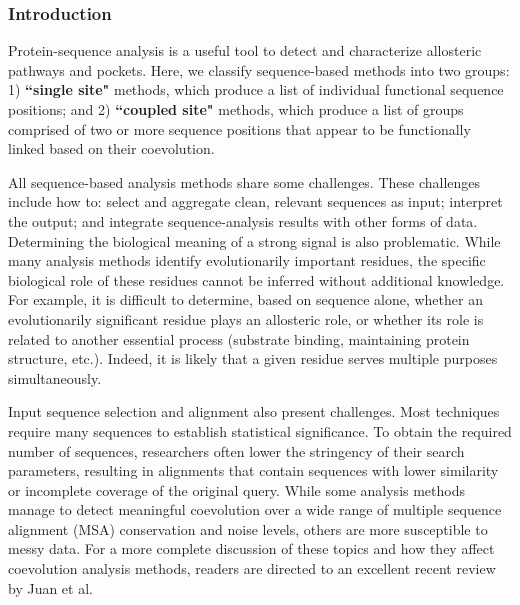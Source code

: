 \subsubsection{Introduction}
\par Protein-sequence analysis is a useful tool to detect and characterize allosteric pathways and pockets. Here, we classify sequence-based methods into two groups: 1) \textbf{``single site"} methods, which produce a list of individual functional sequence positions; and 2) \textbf{``coupled site"} methods, which produce a list of groups comprised of two or more sequence positions that appear to be functionally linked based on their coevolution.
\par All sequence-based analysis methods share some challenges. These challenges include how to: select and aggregate clean, relevant sequences as input; interpret the output; and integrate sequence-analysis results with other forms of data. Determining the biological meaning of a strong signal is also problematic. While many analysis methods identify evolutionarily important residues, the specific biological role of these residues cannot be inferred without additional knowledge. For example, it is difficult to determine, based on sequence alone, whether an evolutionarily significant residue plays an allosteric role, or whether its role is related to another essential process (\eg substrate binding, maintaining protein structure, etc.).\cite{Talavera2015,Fodor2004c} Indeed, it is likely that a given residue serves multiple purposes simultaneously.
\par Input sequence selection and alignment also present challenges. Most techniques require many sequences to establish statistical significance. To obtain the required number of sequences, researchers often lower the stringency of their search parameters, resulting in alignments that contain sequences with lower similarity or incomplete coverage of the original query. While some analysis methods manage to detect meaningful coevolution over a wide range of multiple sequence alignment (MSA) conservation and noise levels, others are more susceptible to messy data.\cite{Fodor2004a,Johansson2010a} For a more complete discussion of these topics and how they affect coevolution analysis methods, readers are directed to an excellent recent review by Juan et al.\cite{Juan2013}

